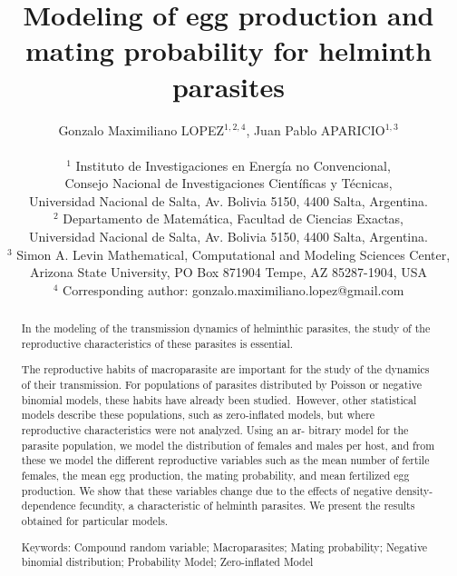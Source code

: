 \documentclass[12pt,a4paper]{article}
\title{Modeling of egg production and mating probability for helminth parasites}
\author{Gonzalo Maximiliano LOPEZ$^{1,2,4}$, Juan Pablo APARICIO$^{1,3}$\\
	\\
	{\small $^1$ Instituto de Investigaciones en Energ\'ia no Convencional,} \\ {\small Consejo Nacional de Investigaciones Cient\'ificas y T\'ecnicas,}\\
	{\small Universidad Nacional de Salta, Av. Bolivia 5150, 4400 Salta, Argentina.}\\
	{\small $^2$ Departamento de Matem\'atica, Facultad de Ciencias Exactas,}\\{\small Universidad Nacional de Salta, Av. Bolivia 5150, 4400 Salta, Argentina.}\\
	{\small $^3$ Simon A. Levin Mathematical, Computational and Modeling Sciences Center,} \\ {\small Arizona State University, PO Box 871904 Tempe, AZ 85287-1904, USA}\\
	{\small $^4$ Corresponding author: gonzalo.maximiliano.lopez@gmail.com}}
\date{}
\theoremstyle{plain}%
\theoremstyle{definition}
\theoremstyle{remark}
\begin{document}
\maketitle

\begin{abstract}

In the modeling of the transmission dynamics of helminthic parasites, the study of the reproductive characteristics of these parasites is essential.

The reproductive habits of macroparasite are important for the study of the dynamics of their transmission. For populations of parasites distributed by Poisson or negative binomial models, these habits have already been studied. However, other statistical models describe these populations, such as zero-inflated models, but where reproductive characteristics were not analyzed. Using an ar- bitrary model for the parasite population, we model the distribution of females and males per host, and from these we model the different reproductive variables such as the mean number of fertile females, the mean egg production, the mating probability, and mean fertilized egg production. We show that these variables change due to the effects of negative density-dependence fecundity, a characteristic of helminth parasites. We present the results obtained for particular models.

	
	Keywords: Compound random variable; Macroparasites; Mating probability; Negative binomial distribution; Probability Model; Zero-inflated Model
\end{abstract}
\end{document}
